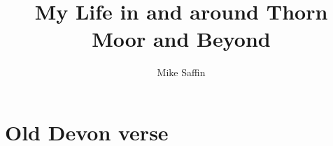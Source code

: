 \documentclass[oneside,12pt,b5paper]{memoir}
\title{My Life in and around Thorn Moor and Beyond}
\author{Mike Saffin}
\date{}
\begin{document}
\maketitle

\chapter{}


\chapter{Old Devon verse}

\end{document}
